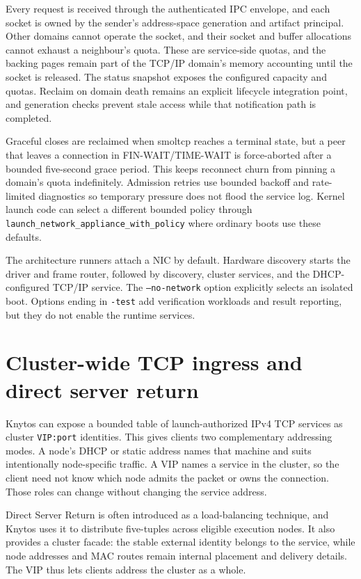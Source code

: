 Every request is received through the
authenticated IPC envelope, and each socket is owned by the sender's
address-space generation and artifact principal. Other domains cannot operate
the socket, and their socket and buffer allocations cannot exhaust a neighbour's
quota. These are service-side quotas, and the backing pages remain part of the
TCP/IP domain's memory accounting until the socket is released. The status
snapshot exposes the configured capacity and quotas. Reclaim on domain death
remains an explicit lifecycle integration point, and generation checks prevent
stale access while that notification path is completed.

Graceful closes are reclaimed when smoltcp reaches a terminal state, but a peer
that leaves a connection in FIN-WAIT/TIME-WAIT is force-aborted after a bounded
five-second grace period. This keeps reconnect churn from pinning a domain's
quota indefinitely. Admission retries use bounded backoff and rate-limited
diagnostics so temporary pressure does not flood the service log.
Kernel launch code can select a different bounded policy through
\texttt{launch\_network\_appliance\_with\_policy} where ordinary boots use these
defaults.

The architecture runners attach a NIC by default. Hardware discovery starts
the driver and frame router, followed by discovery, cluster services, and the
DHCP-configured TCP/IP service. The \texttt{--no-network} option explicitly
selects an isolated boot. Options ending in \texttt{-test} add verification
workloads and result reporting, but they do not enable the runtime services.

\section{Cluster-wide TCP ingress and direct server return}
\label{sec:distributed-l2-ingress}

Knytos can expose a bounded table of launch-authorized IPv4 TCP services as
cluster \texttt{VIP:port} identities. This gives clients two complementary
addressing modes. A node's DHCP or static address names that machine and suits
intentionally node-specific traffic. A VIP names a service in the cluster, so
the client need not know which node admits the packet or owns the connection.
Those roles can change without changing the service address.

Direct Server Return is often introduced as a load-balancing technique, and
Knytos uses it to distribute five-tuples across eligible execution nodes.
It also provides a cluster facade: the stable external identity belongs to the
service, while node addresses and MAC routes remain internal placement and
delivery details. The VIP thus lets clients address the cluster as a whole.

